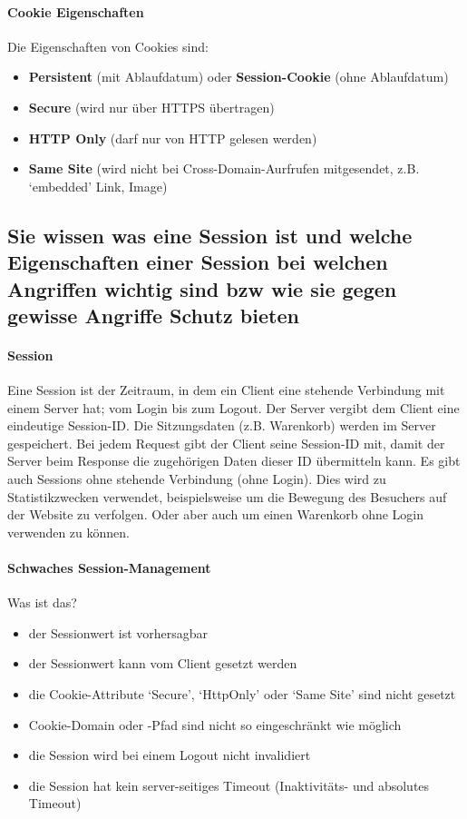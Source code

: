 \documentclass[10pt,a4paper]{article}
\begin{document}
\paragraph*{Cookie Eigenschaften}Die Eigenschaften von Cookies sind:
\begin{itemize}[noitemsep,topsep=0pt,leftmargin=*]
    \item \textbf{Persistent} (mit Ablaufdatum) oder \textbf{Session-Cookie} (ohne Ablaufdatum)
    \item \textbf{Secure} (wird nur über HTTPS übertragen)
    \item \textbf{HTTP Only} (darf nur von HTTP gelesen werden)
    \item \textbf{Same Site} (wird nicht bei Cross-Domain-Aurfrufen mitgesendet, z.B. `embedded' Link, Image)
\end{itemize}

\subsection*{Sie wissen was eine Session ist und welche Eigenschaften einer Session bei welchen Angriffen wichtig sind bzw wie sie gegen gewisse Angriffe Schutz bieten}
\paragraph*{Session} Eine Session ist der Zeitraum, in dem ein Client eine stehende Verbindung mit einem Server hat; vom Login bis zum Logout. Der Server vergibt dem Client eine eindeutige Session-ID. Die Sitzungsdaten (z.B. Warenkorb) werden im Server gespeichert. Bei jedem Request gibt der Client seine Session-ID mit, damit der Server beim Response die zugehörigen Daten dieser ID übermitteln kann. Es gibt auch Sessions ohne stehende Verbindung (ohne Login). Dies wird zu Statistikzwecken verwendet, beispielsweise um die Bewegung des Besuchers auf der Website zu verfolgen. Oder aber auch um einen Warenkorb ohne Login verwenden zu können.
\paragraph*{Schwaches Session-Management}Was ist das?
\begin{itemize}[noitemsep,topsep=0pt,leftmargin=*]
    \item der Sessionwert ist vorhersagbar
    \item der Sessionwert kann vom Client gesetzt werden
    \item die Cookie-Attribute `Secure', `HttpOnly' oder `Same Site' sind nicht gesetzt
    \item Cookie-Domain oder -Pfad sind nicht so eingeschränkt wie möglich
    \item die Session wird bei einem Logout nicht invalidiert
    \item die Session hat kein server-seitiges Timeout (Inaktivitäts- und absolutes Timeout)
\end{itemize}
\end{document}
